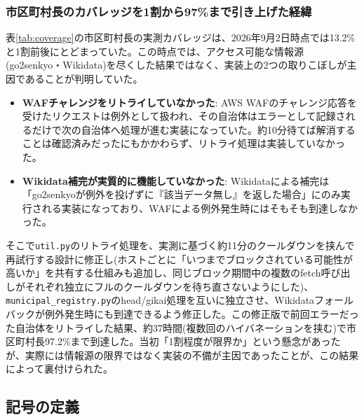 \documentclass[a4paper,11pt]{ltjsarticle}
\begin{document}
\subsubsection{市区町村長のカバレッジを1割から97\%まで引き上げた経緯}

表\ref{tab:coverage}の市区町村長の実測カバレッジは、2026年9月2日時点では13.2\%と1割前後にとどまっていた。この時点では、アクセス可能な情報源(go2senkyo・Wikidata)を尽くした結果ではなく、実装上の2つの取りこぼしが主因であることが判明していた。

\begin{itemize}
  \item \textbf{WAFチャレンジをリトライしていなかった}: AWS WAFのチャレンジ応答を受けたリクエストは例外として扱われ、その自治体はエラーとして記録されるだけで次の自治体へ処理が進む実装になっていた。約10分待てば解消することは確認済みだったにもかかわらず、リトライ処理は実装していなかった。
  \item \textbf{Wikidata補完が実質的に機能していなかった}: Wikidataによる補完は「go2senkyoが例外を投げずに『該当データ無し』を返した場合」にのみ実行される実装になっており、WAFによる例外発生時にはそもそも到達しなかった。
\end{itemize}

そこで\texttt{util.py}のリトライ処理を、実測に基づく約11分のクールダウンを挟んで再試行する設計に修正し(ホストごとに「いつまでブロックされている可能性が高いか」を共有する仕組みも追加し、同じブロック期間中の複数のfetch呼び出しがそれぞれ独立にフルのクールダウンを待ち直さないようにした)、\texttt{municipal\_registry.py}のhead/gikai処理を互いに独立させ、Wikidataフォールバックが例外発生時にも到達できるよう修正した。この修正版で前回エラーだった自治体をリトライした結果、約37時間(複数回のハイバネーションを挟む)で市区町村長97.2\%まで到達した。当初「1割程度が限界か」という懸念があったが、実際には情報源の限界ではなく実装の不備が主因であったことが、この結果によって裏付けられた。

\subsection{記号の定義}
\end{document}
